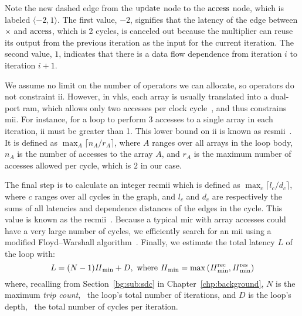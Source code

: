 Note the new dashed edge from the $\operatorname{\mathrm{update}}$ node to the $\operatorname{\mathrm{access}}$ node,
which is labeled $\langle -2, 1 \rangle$.  The first value, $-2$, signifies
that the latency of the edge between $\times$ and $\operatorname{\mathrm{access}}$, which is 2
cycles, is canceled out because the multiplier can reuse its output from the
previous iteration as the input for the current iteration. The second value,
$1$, indicates that there is a data flow dependence from iteration $i$ to
iteration $i+1$.

We assume no limit on the number of operators we can allocate, so operators
do not constraint \gls{ii}.  However, in \gls{vhls}, each array is usually
translated into a dual-port \gls{ram}, which allows only two accesses per
clock cycle~\cite{vivado_hls}, and thus constrains \gls{mii}.  For instance,
for a loop to perform 3 accesses to a single array in each iteration,
\gls{ii} must be greater than 1.  This lower bound on \gls{ii} is known as
\acrfull{resmii}~\cite{rau94}. It is defined as $\max_A \lceil {n_A}/{r_A}
\rceil$, where $A$ ranges over all arrays in the loop body, $n_A$ is the number
of accesses to the array $A$, and $r_A$ is the maximum number of accesses
allowed per cycle, which is $2$ in our case.

The final step is to calculate an integer \gls{recmii} which is defined as
$\max_c \lceil {l_c}/{d_c} \rceil$, where $c$ ranges over all cycles in
the graph, and $l_c$ and $d_c$ are respectively the sums of all latencies
and dependence distances of the edges in the cycle. This value is known as
the \acrlong{recmii}~\cite{rau94}.  Because a typical \gls{mir} with array
accesses could have a very large number of cycles, we efficiently search for an
\gls{mii} using a modified Floyd--Warshall algorithm~\cite{rau94}.  Finally, we
estimate the total latency $L$ of the loop with:
\begin{equation}
    L = (N - 1) \mathit{II}_{\rm min} + D,
    \text{~where~}
        \mathit{II}_{\rm min} = \max\left(\mathit{II}_{\rm min}^{\rm rec}, \mathit{II}_{\rm min}^{\rm res}\right)
    \nonumber
\end{equation}
where, recalling from Section~\ref{bg:sub:sdc} in Chapter~\ref{chp:background},
$N$ is the maximum \emph{trip count}, \ie~the loop's total number of
iterations, and $D$ is the loop's depth, \ie~the total number of cycles per
iteration.

